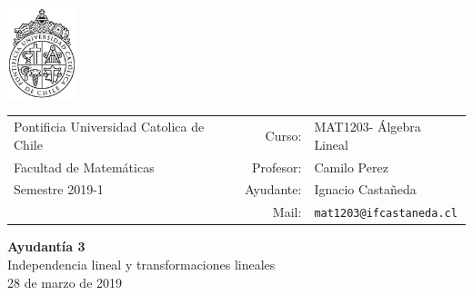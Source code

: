 \documentclass[12pt]{article}
\makeatletter
\newcommand{\ayudantia}{{\sc Ayudantía 3}}
\newcommand{\tituloayu}{Independencia lineal y transformaciones lineales}
\newcommand{\fecha}{28 de marzo de 2019}
\newcommand{\sigla}{MAT1203}
\newcommand{\nombre}{Álgebra Lineal}
\newcommand{\profesor}{Camilo Perez}
\newcommand{\ano}{2019}
\newcommand{\semestre}{1}
\newcommand{\mail}{mat1203@ifcastaneda.cl}
\makeatother
\begin{document}
\thispagestyle{empty}

\begin{minipage}{2cm}
	\includegraphics[width=2cm]{../../../../img/logo.pdf}
	\vspace{0.5cm}
\end{minipage}
\begin{minipage}{\linewidth}
	\begin{tabular}{lrl}
		{\scriptsize\sc Pontificia Universidad Catolica de Chile} & \hspace*{0.7in}Curso: &
		\sigla  - \nombre\\
		{\sc Facultad de Matemáticas}&
		Profesor: & \profesor \\
		{\sc Semestre \ano-\semestre} & Ayudante: & {Ignacio Castañeda}\\
		& {Mail:} & \texttt{\mail}
	\end{tabular}
\end{minipage}

\vspace{-10mm}
\begin{center}
	{\LARGE\bf \ayudantia}\\
	\vspace{0.1cm}
	{\tituloayu}\\
	\vspace{0.1cm}
	\fecha\\
	\vspace{0.4cm}
\end{center}
\end{document}

